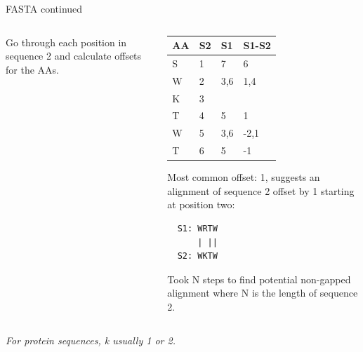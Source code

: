\documentclass[pdf]{beamer}
\begin{document}
\begin{frame}[fragile]{FASTA continued}
\begin{columns}
\begin{column}[t]{0.5\textwidth}
      \vspace{2ex}
      Go through each position in sequence 2 and calculate offsets for the AAs.
      \end{column}
    \begin{column}[t]{0.5\textwidth}
      {\tiny
        \setlength{\tabcolsep}{0.5em}
        \begin{tabular}{l|ll|l}
          AA & S2 & S1 & S1-S2 \\
          \hline
          S & 1 & 7 & 6\\
          W & 2 & 3,6 & 1,4\\
          K & 3 & & \\
          T & 4 & 5 & 1\\
          W & 5 & 3,6 & -2,1\\
          T & 6 & 5 & -1\\
        \end{tabular}
      }
      \pause

      \vspace{2ex}
      {\small
      Most common offset: 1, suggests an alignment of sequence 2 offset by 1
      starting at position two:

\begin{verbatim}
  S1: WRTW
      | ||
  S2: WKTW      
\end{verbatim}
      
      Took N steps to find potential non-gapped alignment where N is the
      length of sequence 2.
    }
    \end{column}
  \end{columns}
  {\small
  \emph{For protein sequences, k usually 1 or 2.}
  }
\end{frame}

\end{document}

